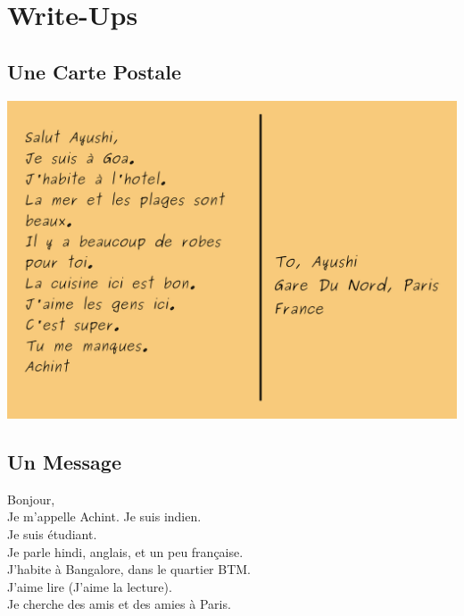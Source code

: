 \section{Write-Ups}

\subsection{Une Carte Postale}
\includegraphics[width=\textwidth]{images/PostCard.png}

\subsection{Un Message}
Bonjour,\\
Je m'appelle Achint. Je suis indien.\\
Je suis \'etudiant. \\
Je parle hindi, anglais, et un peu fran\c{c}aise.\\
J'habite \`a Bangalore, dans le quartier BTM.\\
J'aime lire (J'aime la lecture).\\
Je cherche des amis et des amies \`a Paris.\\
